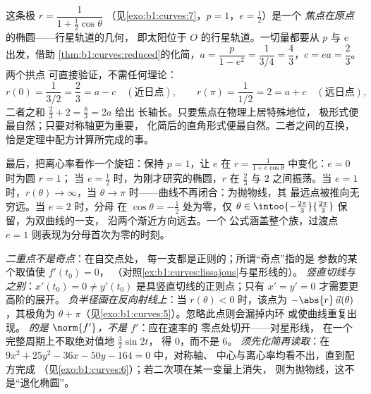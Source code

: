 \begin{example}[由极坐标方程读出轨道]
\label{ex:b1:curves:orbit}
这条极 $r = \dfrac{1}{1 + \frac12\cos\theta}$
（见\cref{exo:b1:curves:7}，$p = 1$，$e = \frac12$）是一个
\emph{焦点在原点}的椭圆——行星轨道的几何，
即太阳位于 $O$ 的行星轨道。一切量都要从
$p$ 与 $e$ 出发，借助
\cref{thm:b1:curves:reduced}的化简，$a = \dfrac{p}{1 - e^2} =
\dfrac{1}{3/4} = \dfrac43$，$c = ea = \dfrac23$。两个拱点
可直接验证，不需任何理论：
\[
r(0) = \frac{1}{3/2} = \frac23 = a - c
\quad (\text{近日点}),
\qquad
r(\pi) = \frac{1}{1/2} = 2 = a + c
\quad (\text{远日点}),
\]
二者之和 $\frac23 + 2 = \frac83 = 2a$ 给出
长轴长。只要焦点在物理上居特殊地位，
极形式便最自然；只要对称轴更为重要，
化简后的直角形式便最自然。二者之间的互换，
恰是定理中配方计算所完成的事。

最后，把离心率看作一个旋钮：保持 $p = 1$，让 $e$ 在 $r
= \frac{1}{1 + e\cos\theta}$ 中变化：$e = 0$ 时为圆 $r = 1$；
当 $e = \frac12$ 时，为刚才研究的椭圆，$r$ 在
$\frac23$ 与 $2$ 之间振荡。当 $e = 1$ 时，$r(\theta) \to \infty$，当 $\theta
\to \pi$ 时——曲线不再闭合：为抛物线，其
最远点被推向无穷远。当 $e = 2$ 时，分母
在 $\cos\theta = -\frac12$ 处为零，仅 $\theta \in
\intoo{-\frac{2\pi}3}{\frac{2\pi}3}$ 保留，为双曲线的一支，
沿两个渐近方向远去。一个
公式涵盖整个族，过渡点 $e =
1$ 则表现为分母首次为零的时刻。
\end{example}

\begin{remark}[常见陷阱]
\label{rem:b1:curves:pitfalls}
\emph{二重点不是奇点}：在自交点处，
每一支都是正则的；所谓“奇点”指的是
参数的某个取值使 $f'(t_0) = 0$，
（对照\cref{ex:b1:curves:lissajous}与星形线的）。
\emph{竖直切线与之别}：$x'(t_0) = 0 \neq y'(t_0)$
是具竖直切线的正则点；只有 $x' = y' = 0$
才需要更高阶的展开。
\emph{负半径画在反向射线上}：当 $r(\theta) <
0$ 时，该点为 $-\abs{r}\,\vec u(\theta)$，其极角为 $\theta +
\pi$（见\cref{exo:b1:curves:5}）。忽略此点则会漏掉内环
或使曲线重复出现。
\emph{的是 $\norm{f'}$，不是 $f'$}：应在速率的
零点处切开——对星形线，
在一个完整周期上不取绝对值地 $\frac32\sin 2t$，
得 $0$，而不是 $6$。
\emph{须先化简再读取}：在 $9x^2 +
25y^2 - 36x - 50y - 164 = 0$ 中，对称轴、
中心与离心率均看不出，直到配方完成
（见\cref{exo:b1:curves:6}）；若二次项在某一变量上消失，
则为抛物线，这不是“退化椭圆”。
\end{remark}

